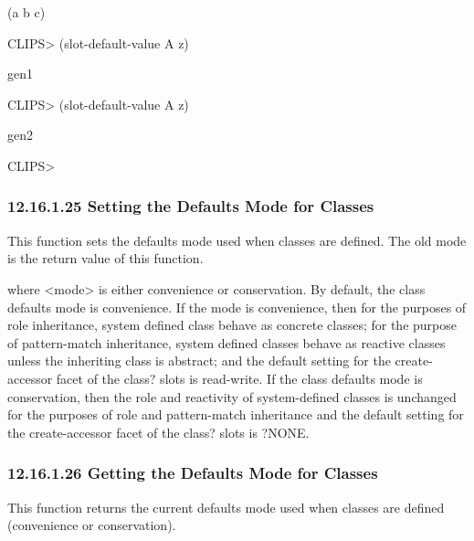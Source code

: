\documentclass[letterpaper,10pt,english]{sphinxmanual}
\begin{document}
(a b c)

CLIPS\textgreater{} (slot-default-value A z)

gen1

CLIPS\textgreater{} (slot-default-value A z)

gen2

CLIPS\textgreater{}


\subsubsection{12.16.1.25 Setting the Defaults Mode for Classes}
\label{\detokenize{actions:setting-the-defaults-mode-for-classes}}
This function sets the defaults mode used when classes are defined. The
old mode is the return value of this function.


\begin{sphinxVerbatim}[commandchars=\\\{\}]
 
\end{sphinxVerbatim}

where \textless{}mode\textgreater{} is either convenience or conservation. By default, the
class defaults mode is convenience. If the mode is convenience, then for
the purposes of role inheritance, system defined class behave as
concrete classes; for the purpose of pattern-match inheritance, system
defined classes behave as reactive classes unless the inheriting class
is abstract; and the default setting for the create-accessor facet of
the class? slots is read-write. If the class defaults mode is
conservation, then the role and reactivity of system-defined classes is
unchanged for the purposes of role and pattern-match inheritance and the
default setting for the create-accessor facet of the class? slots is
?NONE.


\subsubsection{12.16.1.26 Getting the Defaults Mode for Classes}
\label{\detokenize{actions:getting-the-defaults-mode-for-classes}}
This function returns the current defaults mode used when classes are
defined (convenience or conservation).


\begin{sphinxVerbatim}[commandchars=\\\{\}]
\end{sphinxVerbatim}
\end{document}
